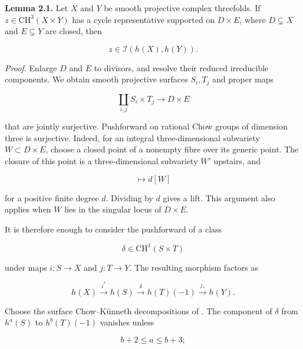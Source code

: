 \documentclass[11pt,a4paper]{article}
\begin{document}
\noindent \textbf{Lemma 2.1.} Let $X$ and $Y$ be smooth projective complex threefolds. If $z\in\mathrm{CH}^3(X\times Y)$ has a cycle representative supported on $D\times E$, where $D\subsetneq X$ and $E\subsetneq Y$ are closed, then

\begin{equation*}
z\in\mathcal I(h(X),h(Y)).
\end{equation*}

\noindent \emph{Proof.} Enlarge $D$ and $E$ to divisors, and resolve their reduced irreducible components. We obtain smooth projective surfaces $S_i,T_j$ and proper maps

\begin{equation*}
\coprod_{i,j}S_i\times T_j\longrightarrow D\times E
\end{equation*}

that are jointly surjective. Pushforward on rational Chow groups of dimension three is surjective. Indeed, for an integral three-dimensional subvariety $W\subset D\times E$, choose a closed point of a nonempty fibre over its generic point. The closure of this point is a three-dimensional subvariety $W'$ upstairs, and

\begin{equation*}
[W']\longmapsto d[W]
\end{equation*}

for a positive finite degree $d$. Dividing by $d$ gives a lift. This argument also applies when $W$ lies in the singular locus of $D\times E$.

It is therefore enough to consider the pushforward of a class

\begin{equation*}
\delta\in\mathrm{CH}^1(S\times T)
\end{equation*}

under maps $i:S\to X$ and $j:T\to Y$. The resulting morphism factors as

\begin{equation*}
h(X)\xrightarrow{i^*}h(S)
\xrightarrow{\delta}h(T)(-1)
\xrightarrow{j_*}h(Y).
\tag{2.3}
\end{equation*}

Choose the surface Chow--Künneth decompositions of \cite[Theorem 1.4]{FV21}. The component of $\delta$ from $h^a(S)$ to $h^b(T)(-1)$ vanishes unless

\begin{equation*}
b+2\leq a\leq b+3;
\end{equation*}
\end{document}
